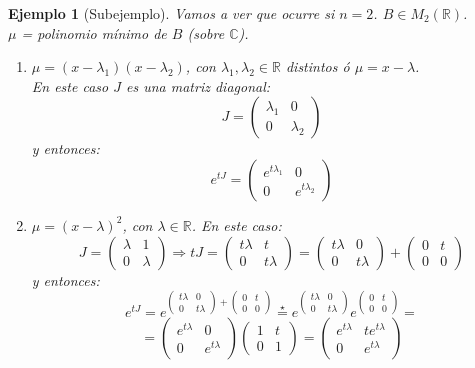 \documentclass[11pt,a4paper]{article}
\theoremstyle{break}
\newtheorem{example}[theorem]{Ejemplo}
\begin{document}
\begin{example}[Subejemplo]
Vamos a ver que ocurre si $n = 2$. $B \in M_{2}(\mathbb{R})$. \\
$\mu$ = polinomio mínimo de $B$ (sobre $\mathbb{C}$).
\begin{enumerate}
\item [Caso 1.] $\mu = (x - \lambda_{1})(x - \lambda_{2})$, con $\lambda_{1}, \lambda_{2} \in \mathbb{R}$ distintos ó $\mu = x - \lambda$. \\
En este caso $J$ es una matriz diagonal:
$$J =
\begin{pmatrix}
\lambda_{1} & 0 \\
0 & \lambda_{2}
\end{pmatrix}$$
y entonces:
$$e^{tJ} =
\begin{pmatrix}
e^{t\lambda_{1}} & 0 \\
0 & e^{t\lambda_{2}}
\end{pmatrix}$$
\item [Caso 2.] $\mu = (x - \lambda)^{2}$, con $\lambda \in \mathbb{R}$. En este caso:
$$J =
\begin{pmatrix}
\lambda & 1 \\
0 & \lambda
\end{pmatrix}
\Rightarrow tJ = 
\begin{pmatrix}
t\lambda & t \\
0 & t\lambda
\end{pmatrix}
=
\begin{pmatrix}
t\lambda & 0 \\
0 & t\lambda
\end{pmatrix}
+
\begin{pmatrix}
0 & t \\
0 & 0
\end{pmatrix}$$
y entonces:
$$e^{tJ} =
e^{
\begin{pmatrix}
t\lambda & 0 \\
0 & t\lambda
\end{pmatrix}
+
\begin{pmatrix}
0 & t \\
0 & 0
\end{pmatrix}
} \overset{\star}{=} e^{
\begin{pmatrix}
t\lambda & 0 \\
0 & t\lambda
\end{pmatrix}
} e^{
\begin{pmatrix}
0 & t \\
0 & 0
\end{pmatrix}
} =$$
$$ =
\begin{pmatrix}
e^{t\lambda} & 0 \\
0 & e^{t\lambda}
\end{pmatrix}
\begin{pmatrix}
1 & t \\
0 & 1
\end{pmatrix}
=
\begin{pmatrix}
e^{t\lambda} & te^{t\lambda} \\
0 & e^{t\lambda}
\end{pmatrix}$$


\end{enumerate}
\end{example}
\end{document}
